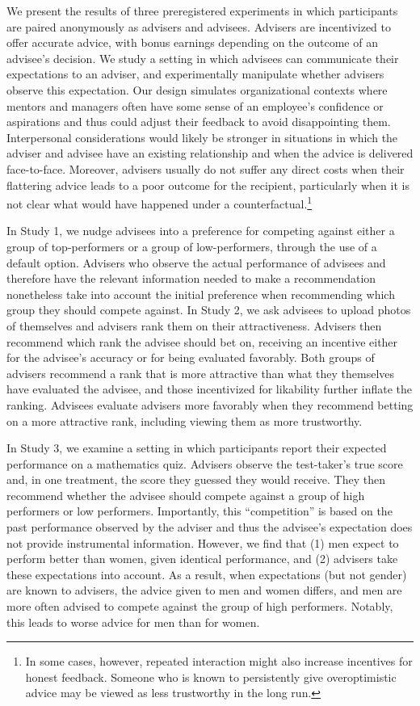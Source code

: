 \documentclass[
  man,
  floatsintext,
  longtable,
  nolmodern,
  notxfonts,
  notimes,
  colorlinks=true,linkcolor=blue,citecolor=blue,urlcolor=blue]{apa7}
\begin{document}
We present the results of three preregistered experiments in which
participants are paired anonymously as advisers and advisees. Advisers
are incentivized to offer accurate advice, with bonus earnings depending
on the outcome of an advisee's decision. We study a setting in which
advisees can communicate their expectations to an adviser, and
experimentally manipulate whether advisers observe this expectation. Our
design simulates organizational contexts where mentors and managers
often have some sense of an employee's confidence or aspirations and
thus could adjust their feedback to avoid disappointing them.
Interpersonal considerations would likely be stronger in situations in
which the adviser and advisee have an existing relationship and when the
advice is delivered face-to-face. Moreover, advisers usually do not
suffer any direct costs when their flattering advice leads to a poor
outcome for the recipient, particularly when it is not clear what would
have happened under a counterfactual.\footnote{In some cases, however,
  repeated interaction might also increase incentives for honest
  feedback. Someone who is known to persistently give overoptimistic
  advice may be viewed as less trustworthy in the long run.}

In Study 1, we nudge advisees into a preference for competing against
either a group of top-performers or a group of low-performers, through
the use of a default option. Advisers who observe the actual performance
of advisees and therefore have the relevant information needed to make a
recommendation nonetheless take into account the initial preference when
recommending which group they should compete against. In Study 2, we ask
advisees to upload photos of themselves and advisers rank them on their
attractiveness. Advisers then recommend which rank the advisee should
bet on, receiving an incentive either for the advisee's accuracy or for
being evaluated favorably. Both groups of advisers recommend a rank that
is more attractive than what they themselves have evaluated the advisee,
and those incentivized for likability further inflate the ranking.
Advisees evaluate advisers more favorably when they recommend betting on
a more attractive rank, including viewing them as more trustworthy.

In Study 3, we examine a setting in which participants report their
expected performance on a mathematics quiz. Advisers observe the
test-taker's true score and, in one treatment, the score they guessed
they would receive. They then recommend whether the advisee should
compete against a group of high performers or low performers.
Importantly, this ``competition'' is based on the past performance
observed by the adviser and thus the advisee's expectation does not
provide instrumental information. However, we find that (1) men expect
to perform better than women, given identical performance, and (2)
advisers take these expectations into account. As a result, when
expectations (but not gender) are known to advisers, the advice given to
men and women differs, and men are more often advised to compete against
the group of high performers. Notably, this leads to worse advice for
men than for women.
\end{document}
